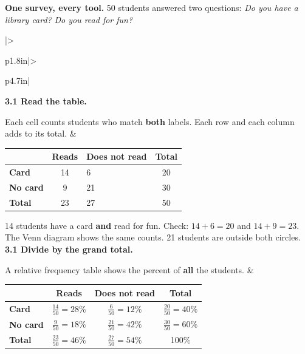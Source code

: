 \documentclass[11pt]{article}
\begin{document}

\textbf{One survey, every tool.} 50 students answered two questions: \textit{Do you have a library card?} \textit{Do you read for fun?}

\vspace{0.5em}
\renewcommand{\arraystretch}{1.4}
\begin{tabular}{|>{\raggedright\arraybackslash}p{1.8in}|>{\raggedright\arraybackslash}p{4.7in}|}
\hline
\textbf{3.1 Read the table.}

Each cell counts students who match \textbf{both} labels. Each row and each column adds to its total. &
\vspace{0.2em}
\begin{minipage}[c]{2.8in}
\renewcommand{\arraystretch}{1.3}
\begin{tabular}{|l|c|C{0.62in}|c|}\hline
 & \textbf{Reads} & \textbf{Does not read} & \textbf{Total} \\ \hline
\textbf{Card} & 14 & 6 & 20 \\ \hline
\textbf{No card} & 9 & 21 & 30 \\ \hline
\textbf{Total} & 23 & 27 & 50 \\ \hline
\end{tabular}
\end{minipage}\hfill
\begin{minipage}[c]{1.8in}\raggedleft
{}
\end{minipage}

\vspace{0.3em}
14 students have a card \textbf{and} read for fun.\newline
Check: $14 + 6 = 20$ \; and \; $14 + 9 = 23$.\newline
The Venn diagram shows the same counts. 21 students are outside both circles. \\ \hline
\textbf{3.1 Divide by the grand total.}

A relative frequency table shows the percent of \textbf{all} the students. &
\vspace{0.2em}
\renewcommand{\arraystretch}{1.5}
\begin{tabular}{|l|c|c|c|}\hline
 & \textbf{Reads} & \textbf{Does not read} & \textbf{Total} \\ \hline
\textbf{Card} & $\frac{14}{50} = 28\%$ & $\frac{6}{50} = 12\%$ & $\frac{20}{50} = 40\%$ \\[0.2em] \hline
\textbf{No card} & $\frac{9}{50} = 18\%$ & $\frac{21}{50} = 42\%$ & $\frac{30}{50} = 60\%$ \\[0.2em] \hline
\textbf{Total} & $\frac{23}{50} = 46\%$ & $\frac{27}{50} = 54\%$ & 100\% \\[0.2em] \hline
\end{tabular}


\end{tabular}
\end{document}
